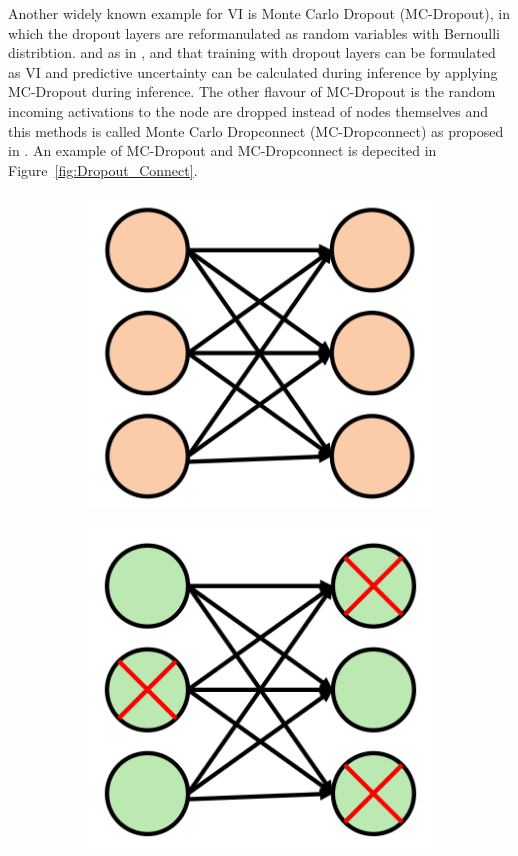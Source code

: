     Another widely known example for VI is Monte Carlo Dropout (MC-Dropout), in which the dropout layers are reformanulated as random variables with Bernoulli distribtion.
    and as in \cite{bhandary2020evaluating}, and \cite{gawlikowski2021survey} that training with dropout layers can be formulated as VI and predictive uncertainty can be calculated during inference by applying MC-Dropout during inference.
    The other flavour of MC-Dropout is the random incoming activations to the node are dropped instead of nodes themselves and this methods is called Monte Carlo Dropconnect (MC-Dropconnect) as proposed in \cite{gawlikowski2021survey}.
    An example of MC-Dropout and MC-Dropconnect is depecited in Figure~\ref{fig:Dropout_Connect}.
    \begin{figure}[htbp]
        \begin{subfigure}{0.33\textwidth}
            \centering
            \includegraphics[scale=0.33]{images/BaseNW_SOTA.png}
            \caption{}
        \end{subfigure}
        \begin{subfigure}{0.33\textwidth}
            \centering
            \includegraphics[scale=0.33]{images/Dropout_SOTA.png}

\end{subfigure}
\end{figure}
